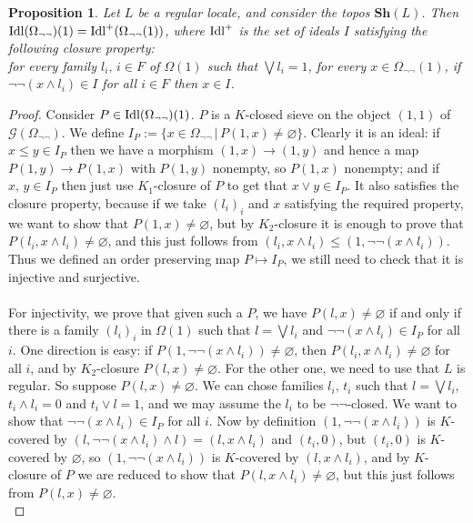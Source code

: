 \documentclass{article}
\newtheorem{proposition}[theorem]{Proposition}
\begin{document}
\begin{proposition}\label{prop_localic}
    Let $L$ be a regular locale, and consider the topos $\mathbf{Sh}(L)$. Then $\textup{Idl}(\Omega_{\neg\neg})(1)=\textup{Idl}^+(\Omega_{\neg\neg}(1))$, where $\textup{Idl}^+$ is the set of ideals $I$ satisfying the following closure property:\\
    for every family $l_i,\,i\in F$ of $\Omega(1)$ such that $\bigvee l_i=1$, for every $x\in \Omega_{\neg\neg}(1)$, if $\neg\neg(x\land l_i)\in I$ for all $i\in F$ then $x\in I$.
\end{proposition}
\begin{proof}
    Consider $P\in \textup{Idl}(\Omega_{\neg\neg})(1)$. $P$ is a $K$-closed sieve on the object $(1,1)$ of $\mathcal{G}(\Omega_{\neg\neg})$. We define $I_P:=\{x\in\Omega_{\neg\neg}\,|\,P(1,x)\ne\varnothing\}$. Clearly it is an ideal: if $x\leq y\in I_P$ then we have a morphism $(1,x)\xrightarrow{}(1,y)$ and hence a map $P(1,y)\xrightarrow{}P(1,x)$ with $P(1,y)$ nonempty, so $P(1,x)$ nonempty; and if $x,\,y\in I_P$ then just use $K_1$-closure of $P$ to get that $x\lor y\in I_P$. It also satisfies the closure property, because if we take $(l_i)_i$ and $x$ satisfying the required property, we want to show that $P(1,x)\ne\varnothing$, but by $K_2$-closure it is enough to prove that $P(l_i,x\land l_i)\ne\varnothing$, and this just follows from $(l_i,x\land l_i)\leq (1,\neg\neg (x\land l_i))$. Thus we defined an order preserving map $P\mapsto I_P$, we still need to check that it is injective and surjective.\\
    \\
    For injectivity, we prove that given such a $P$, we have $P(l,x)\ne\varnothing$ if and only if there is a family $(l_i)_i$ in $\Omega(1)$ such that $l=\bigvee l_i$ and $\neg\neg (x\land l_i)\in I_P$ for all $i$. One direction is easy: if $P(1,\neg\neg(x\land l_i))\ne\varnothing$, then $P(l_i,x\land l_i)\ne\varnothing$ for all $i$, and by $K_2$-closure $P(l,x)\ne\varnothing$. For the other one, we need to use that $L$ is regular. So suppose $P(l,x)\ne\varnothing$. We can chose families $l_i,\,t_i$ such that $l=\bigvee l_i$, $t_i\land l_i=0$ and $t_i\vee l= 1$, and we may assume the $l_i$ to be $\neg\neg$-closed. We want to show that $\neg\neg (x\land l_i)\in I_P$ for all $i$. Now by definition $(1,\neg\neg (x\land l_i))$ is $K$-covered by $(l,\neg\neg (x\land l_i)\land l)=(l,x\land l_i)$ and $(t_i,0)$, but $(t_i,0)$ is $K$-covered by $\varnothing$, so $(1,\neg\neg (x\land l_i))$ is $K$-covered by $(l,x\land l_i)$, and by $K$-closure of $P$ we are reduced to show that $P(l,x\land l_i)\ne\varnothing$, but this just follows from $P(l,x)\ne\varnothing$.\\

\end{proof}
\end{document}
